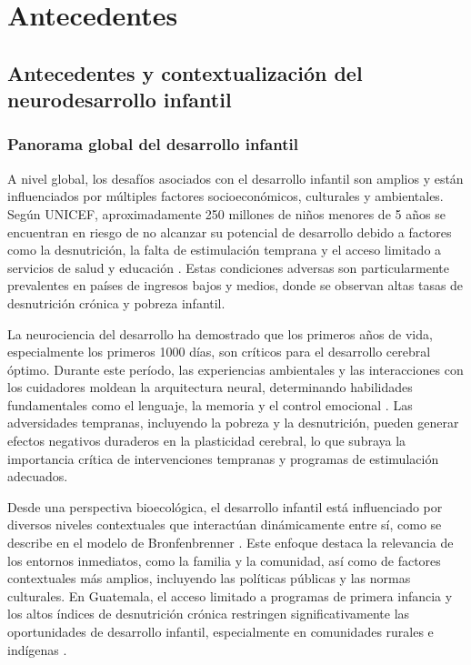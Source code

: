 \chapter{Antecedentes}
\section{Antecedentes y contextualización del neurodesarrollo infantil}
\subsection{Panorama global del desarrollo infantil}
A nivel global, los desafíos asociados con el desarrollo infantil son amplios 
y están influenciados por múltiples factores socioeconómicos, culturales y 
ambientales. Según UNICEF, aproximadamente 250 millones de niños menores de 5 
años se encuentran en riesgo de no alcanzar su potencial de desarrollo debido 
a factores como la desnutrición, la falta de estimulación temprana y el acceso 
limitado a servicios de salud y educación \cite{UNICEF2023}. Estas condiciones 
adversas son particularmente prevalentes en países de ingresos bajos y medios, 
donde se observan altas tasas de desnutrición crónica y pobreza infantil.

La neurociencia del desarrollo ha demostrado que los primeros años de vida, 
especialmente los primeros 1000 días, son críticos para el desarrollo cerebral 
óptimo. Durante este período, las experiencias ambientales y las interacciones 
con los cuidadores moldean la arquitectura neural, determinando habilidades 
fundamentales como el lenguaje, la memoria y el control emocional 
\cite{Stiles2010}. Las adversidades tempranas, incluyendo la pobreza y la 
desnutrición, pueden generar efectos negativos duraderos en la plasticidad 
cerebral, lo que subraya la importancia crítica de intervenciones tempranas y 
programas de estimulación adecuados.

Desde una perspectiva bioecológica, el desarrollo infantil está influenciado 
por diversos niveles contextuales que interactúan dinámicamente entre sí, como 
se describe en el modelo de Bronfenbrenner \cite{Bronfenbrenner2005}. Este 
enfoque destaca la relevancia de los entornos inmediatos, como la familia y la 
comunidad, así como de factores contextuales más amplios, incluyendo las 
políticas públicas y las normas culturales. En Guatemala, el acceso limitado a 
programas de primera infancia y los altos índices de desnutrición crónica 
restringen significativamente las oportunidades de desarrollo infantil, 
especialmente en comunidades rurales e indígenas \cite{SESAN2022}.

